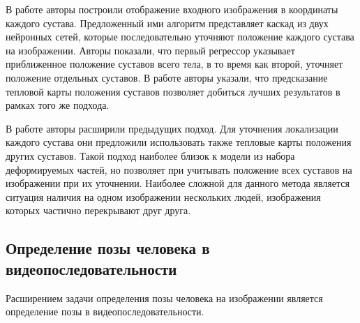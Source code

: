 В работе \cite{toshev2014deeppose} авторы построили отображение входного изображения в координаты каждого сустава. Предложенный ими алгоритм представляет каскад из двух нейронных сетей, которые последовательно уточняют положение каждого сустава на изображении. Авторы показали, что первый регрессор указывает приближенное положение суставов всего тела, в то время как второй, уточняет положение отдельных суставов. В работе \cite{tompson2015efficient} авторы указали, что предсказание тепловой карты положения суставов позволяет добиться лучших результатов в рамках того же подхода.

В работе \cite{bulat2016human} авторы расширили предыдущих подход. Для уточнения локализации каждого сустава они предложили использовать также тепловые карты положения других суставов. Такой подход наиболее близок к модели из набора деформируемых частей, но позволяет при учитывать положение всех суставов на изображении при их уточнении. Наиболее сложной для данного метода является ситуация наличия на одном изображении нескольких людей, изображения которых частично перекрывают друг друга.
 
\subsection{Определение позы человека в видеопоследовательности}

Расширением задачи определения позы человека на изображении является определение позы в видеопоследовательности.
